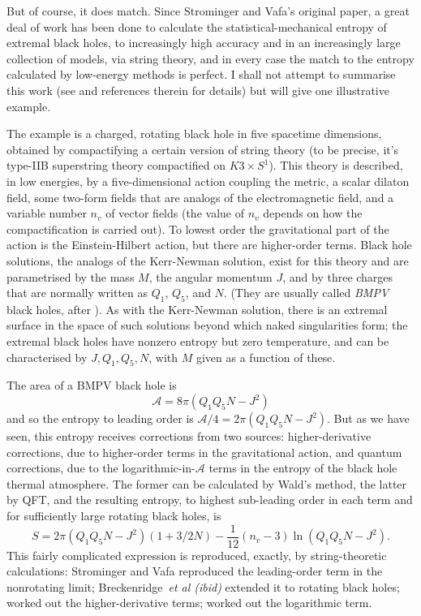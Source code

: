 \documentclass[12pt]{article}
\newcommand{\mc}[1]{\ensuremath{\mathcal{#1}}}
\newcommand{\be}{\begin{equation}}
\newcommand{\ee}{\end{equation}}
\begin{document}
But of course, it does match. Since Strominger and Vafa's original paper, a great deal of work has been done to calculate the statistical-mechanical entropy of extremal black holes, to increasingly high accuracy and in an increasingly large collection of models, via string theory, and in every case the match to the entropy calculated by low-energy methods is perfect. I shall not attempt to summarise this work (see  and references therein for details) but will give one illustrative example.

The example is a charged, rotating black hole in five spacetime dimensions, obtained by compactifying a certain version of string theory (to be precise, it's type-IIB superstring theory compactified on $K3\times S^1$). This theory is described, in low energies, by a five-dimensional action coupling the metric, a scalar dilaton field, some two-form fields that are analogs of the electromagnetic field, and a variable number $n_v$ of vector fields (the value of $n_v$ depends on how the compactification is carried out). To lowest order the gravitational part of the action is the Einstein-Hilbert action, but there are higher-order terms. Black hole solutions, the analogs of the Kerr-Newman solution, exist for this theory and are parametrised by the mass $M$, the angular momentum $J$, and by three charges that are normally written as $Q_1$, $Q_5$, and $N$. (They are usually called \emph{BMPV} black holes, after ). As with the Kerr-Newman solution, there is an extremal surface in the space of such solutions beyond which naked singularities form; the extremal black holes have nonzero entropy but zero temperature, and can be characterised by $J, Q_1, Q_5, N$, with $M$ given as a function of these.

The area of a BMPV black hole is 
\be
\mc{A}=8 \pi (Q_1Q_5N - J^2)
\ee
and so the entropy to leading order is $\mc{A}/4=2 \pi (Q_1Q_5N - J^2)$. But as we have seen, this entropy receives corrections from two sources: higher-derivative corrections, due to higher-order terms in the gravitational action, and quantum corrections, due to the logarithmic-in-\mc{A} terms in the entropy of the black hole thermal atmosphere. The former can be calculated by Wald's method, the latter by QFT, and the resulting entropy, to highest sub-leading order in each term and for sufficiently large rotating black holes, is
\be
S = 2 \pi (Q_1Q_5N - J^2) (1 + 3/2N) - \frac{1}{12} (n_v-3) \ln (Q_1 Q_5 N - J^2).
\ee
This fairly complicated expression is reproduced, exactly, by string-theoretic calculations: Strominger and Vafa reproduced the leading-order term in the nonrotating limit; Breckenridge~\emph{et al (ibid)} extended it to rotating black holes;  worked out the higher-derivative terms;  worked out the logarithmic term. 
\end{document}
